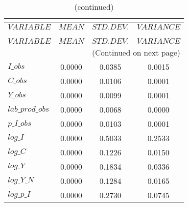  
\begin{center}
\begin{longtable}{lccc} 
\caption{THEORETICAL MOMENTS}\\
 \label{Table:th_moments}\\
\toprule 
$VARIABLE        $	 & 	 $         MEAN$	 & 	 $    STD. DEV.$	 & 	 $     VARIANCE$\\
\midrule \endfirsthead 
\caption{(continued)}\\
 \toprule \\ 
$VARIABLE        $	 & 	 $         MEAN$	 & 	 $    STD. DEV.$	 & 	 $     VARIANCE$\\
\midrule \endhead 
\midrule \multicolumn{4}{r}{(Continued on next page)} \\ \bottomrule \endfoot 
\bottomrule \endlastfoot 
$I\_obs          $	 & 	       0.0000	 & 	       0.0385	 & 	       0.0015 \\ 
$C\_obs          $	 & 	       0.0000	 & 	       0.0106	 & 	       0.0001 \\ 
$Y\_obs          $	 & 	       0.0000	 & 	       0.0099	 & 	       0.0001 \\ 
$lab\_prod\_obs  $	 & 	       0.0000	 & 	       0.0068	 & 	       0.0000 \\ 
$p\_I\_obs       $	 & 	       0.0000	 & 	       0.0103	 & 	       0.0001 \\ 
$log\_I          $	 & 	       0.0000	 & 	       0.5033	 & 	       0.2533 \\ 
$log\_C          $	 & 	       0.0000	 & 	       0.1226	 & 	       0.0150 \\ 
$log\_Y          $	 & 	       0.0000	 & 	       0.1834	 & 	       0.0336 \\ 
$log\_Y\_N       $	 & 	       0.0000	 & 	       0.1284	 & 	       0.0165 \\ 
$log\_p\_I       $	 & 	       0.0000	 & 	       0.2730	 & 	       0.0745 \\ 
\end{longtable}
 \end{center}
